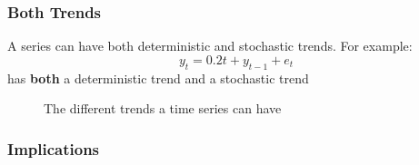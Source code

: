 \documentclass[11pt]{article}
\begin{document}
\subsubsection{Both Trends}

A series can have both deterministic and stochastic trends. For example:
\[y_t = 0.2t + y_{t-1} + e_t\]
has \textbf{both} a deterministic trend and a stochastic trend

\begin{figure}[h]
    \centering
    \qquad
    \qquad
    \caption{The different trends a time series can have}%
    \label{fig:trends2}%
\end{figure}

\subsubsection{Implications}
\end{document}
